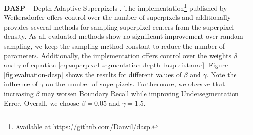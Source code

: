 \textbf{DASP} -- Depth-Adaptive Superpixels \cite{WeikersdorferGossowBeetz:2012}. The implementation\footnote{Available at \url{https://github.com/Danvil/dasp}.} published by Weikersdorfer \etal offers control over the number of superpixels and additionally provides several methods for sampling superpixel centers from the superpixel density. As all evaluated methods show no significant improvement over random sampling, we keep the sampling method constant to reduce the number of parameters. Additionally, the implementation offers control over the weights $\beta$ and $\gamma$ of equation \eqref{eq:superpixel-segmentation-depth-dasp-distance}. Figure \ref{fig:evaluation-dasp} shows the results for different values of $\beta$ and $\gamma$. Note the influence of $\gamma$ on the number of superpixels. Furthermore, we observe that increasing $\beta$ may worsen Boundary Recall while improving Undersegmentation Error. Overall, we choose $\beta = 0.05$ and $\gamma = 1.5$.
